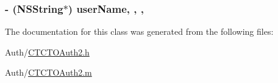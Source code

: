 \hypertarget{interface_c_t_c_t_o_auth2_a538043b0054903e74e04840050e9b5f8}{
\subsubsection[{user\-Name}]{\setlength{\rightskip}{0pt plus 5cm}-\/ (N\-S\-String$\ast$) user\-Name\hspace{0.3cm}{\ttfamily [read]}, {\ttfamily [write]}, {\ttfamily [nonatomic]}, {\ttfamily [assign]}}}\label{interface_c_t_c_t_o_auth2_a538043b0054903e74e04840050e9b5f8}


The documentation for this class was generated from the following files\-:\begin{DoxyCompactItemize}
\item 
Auth/\hyperlink{_c_t_c_t_o_auth2_8h}{C\-T\-C\-T\-O\-Auth2.\-h}\item 
Auth/\hyperlink{_c_t_c_t_o_auth2_8m}{C\-T\-C\-T\-O\-Auth2.\-m}\end{DoxyCompactItemize}
